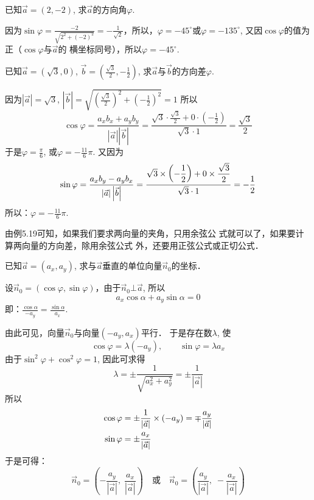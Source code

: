 \begin{example}
    已知$\vec{a}=(2,-2)$, 求$\vec{a}$的方向角$\varphi$.
\end{example}

\begin{solution}
    因为$\sin\varphi=\frac{-2}{\sqrt{2^2+(-2)^2}}=-\frac{1}{\sqrt{2}}$，所以，$\varphi=-45^{\circ}$或$\varphi=-135^{\circ}$, 又因$\cos\varphi$的值为正（$\cos\varphi$与$\vec{a}$的
横坐标同号），所以$\varphi=-45^{\circ}$.
\end{solution}


\begin{example}
    已知$\vec{a}=(\sqrt{3},0)$, $\vec{b}=\left(\frac{\sqrt{3}}{2},-\frac{1}{2}\right)$, 求$\vec{a}$与$\vec{b}$的方向差$\varphi$.
\end{example}

\begin{solution}
因为$|\vec{a}|=\sqrt{3}$, $|\vec{b}|=\sqrt{\left(\frac{\sqrt{3}}{2}\right)^2+\left(-\frac{1}{2}\right)^2}=1$
所以
\[\cos\varphi=\frac{a_xb_x+a_yb_y}{|\vec{a}|\left|\vec{b}\right|}=\frac{\sqrt{3}\cdot \frac{\sqrt{3}}{2}+0\cdot \left(-\frac{1}{2}\right)}{\sqrt{3}\cdot 1}=\frac{\sqrt{3}}{2}\]
于是$\varphi=\frac{\pi}{6}$, 或$\varphi=-\frac{11}{6}\pi$. 又因为
\[\sin\varphi=\dfrac{a_xb_y-a_yb_x}{|\vec{a}|\left|\vec{b}\right|}=\dfrac{\sqrt{3}\times \left(-\dfrac{1}{2}\right)+0\times \dfrac{\sqrt{3}}{2}}{\sqrt{3}\cdot 1}=-\dfrac{1}{2}\]
所以：$\varphi=-\frac{11}{6}\pi$.
\end{solution}

由例5.19可知，如果我们要求两向量的夹角，只用余弦公
式就可以了，如果要计算两向量的方向差，除用余弦公式
外，还要用正弦公式或正切公式．


\begin{example}
    已知$\vec{a}=(a_x,a_y)$, 求与$\vec{a}$垂直的单位向量$\vec{n}_0$的坐标．
\end{example}

\begin{solution}
    设$\vec{n}_0=(\cos\varphi,\sin\varphi)$，由于$\vec{n}_0\bot \vec{a}$, 所以
\[a_x\cos\alpha+a_y\sin\alpha= 0\]
即：$\frac{\cos\alpha}{-a_y}=\frac{\sin\alpha}{a_x}$.

由此可见，向量$\vec{n}_0$与向量$(-a_y,a_x)$平行．
于是存在数$\lambda$, 使
\[\cos\varphi=\lambda(-a_y),\qquad \sin\varphi=\lambda a_x\]
由于$\sin^2\varphi +\cos^2\varphi =1$, 因此可求得
\[\lambda=\pm\frac{1}{\sqrt{a^2_x+a^2_y}}=\pm\frac{1}{|\vec{a}|}\]
所以
\[\begin{split}
    \cos\varphi&=\pm\dfrac{1}{|\vec{a}|}\times (-a_y)=\mp\dfrac{a_y}{|\vec{a}|}\\
    \sin\varphi&=\pm\dfrac{a_x}{|\vec{a}|}
\end{split}\]
于是可得：
\[\vec{n}_0=\left(-\frac{a_y}{|\vec{a}|},\; \frac{a_x}{|\vec{a}|}\right)\quad \text{或}\quad \vec{n}_0=\left(\frac{a_y}{|\vec{a}|},\; -\frac{a_x}{|\vec{a}|}\right)\]
\end{solution}

